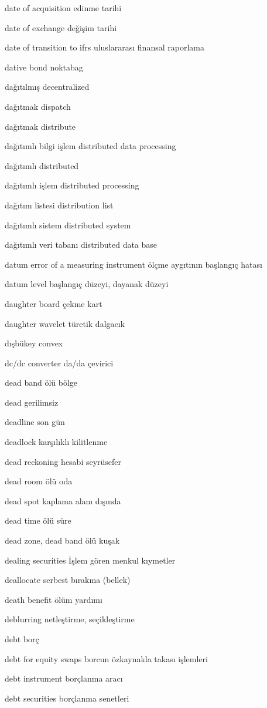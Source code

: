 \documentclass[12pt,fleqn]{article}\usepackage{../../common}
\begin{document}
date of acquisition edinme tarihi

date of exchange değişim tarihi

date of transition to ifrs uluslararası finansal raporlama

dative bond noktabag

dağıtılmış decentralized

dağıtmak dispatch

dağıtmak distribute

dağıtımlı bilgi işlem distributed data processing

dağıtımlı distributed

dağıtımlı işlem distributed processing

dağıtım listesi distribution list

dağıtımlı sistem distributed system

dağıtımlı veri tabanı distributed data base

datum error of a measuring instrument ölçme aygıtının başlangıç hatası

datum level başlangıç düzeyi, dayanak düzeyi

daughter board çekme kart

daughter wavelet türetik dalgacık

dışbükey convex

dc/dc converter da/da çevirici

dead band ölü bölge

dead gerilimsiz

deadline son gün

deadlock karşılıklı kilitlenme

dead reckoning hesabi seyrüsefer

dead room ölü oda

dead spot kaplama alanı dışında

dead time ölü süre

dead zone, dead band ölü kuşak

dealing securities İşlem gören menkul kıymetler

deallocate serbest bırakma (bellek)

death benefit ölüm yardımı

deblurring netleştirme, seçikleştirme

debt borç

debt for equity swaps borcun özkaynakla takası işlemleri

debt instrument borçlanma aracı

debt securities borçlanma senetleri
\end{document}
